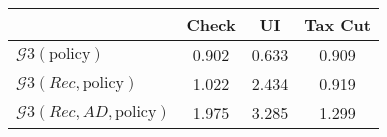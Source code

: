 \begin{tabular}{@{}lccc@{}} 
\toprule 
                          & Check      & UI    & Tax Cut    \\  \midrule 
$\mathcal{G}3(\text{policy})$ & 0.902  & 0.633  & 0.909     \\ 
$\mathcal{G}3(Rec,\text{policy})$ & 1.022  & 2.434  & 0.919     \\ 
$\mathcal{G}3(Rec, AD,\text{policy})$ & 1.975  & 3.285  & 1.299     \\ 
\end{tabular}  
